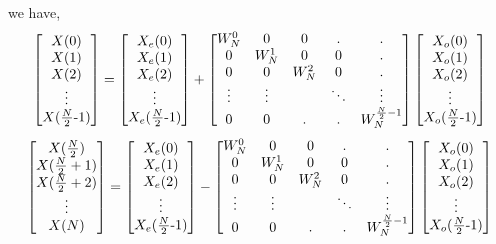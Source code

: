 \documentclass{beamer}
\begin{document}
\begin{frame}
    

we have,
\begin{equation}
\begin{bmatrix}
X(0) \\
X(1) \\
X(2) \\
\vdots \\
X(${{$\frac{N}{2}$}-1}$)
\end{bmatrix}
= 
\begin{bmatrix}
X_{e}(0) \\
X_{e}(1) \\
X_{e}(2) \\
\vdots \\
X_{e}(${{$\frac{N}{2}$}-1}$)
\end{bmatrix}
+
\begin{bmatrix}
W^{0}_{N} & 0  &0 &. &. \\
0 & W^{1}_{N} & 0 & 0 &. \\
0 & 0 & W^{2}_{N} & 0 &. \\
\vdots & \vdots& & \ddots & \vdots\\
0 & 0 &. &. &W^{\frac{N}{2}-1}_{N}
\end{bmatrix}
\begin{bmatrix}
X_{o}(0) \\
X_{o}(1) \\
X_{o}(2) \\
\vdots \\
X_{o}(${{$\frac{N}{2}$}-1}$)
\end{bmatrix}
\end{equation}
\bigskip
\begin{equation}
\begin{bmatrix}
X(\frac{N}{2}) \\
X(\frac{N}{2}+1) \\
X(\frac{N}{2}+2) \\
\vdots \\
X(N)
\end{bmatrix}
= 
\begin{bmatrix}
X_{e}(0) \\
X_{e}(1) \\
X_{e}(2) \\
\vdots \\
X_{e}(${{$\frac{N}{2}$}-1}$)
\end{bmatrix}
-
\begin{bmatrix}
W^{0}_{N} & 0  &0 &. &. \\
0 & W^{1}_{N} & 0 & 0 &. \\
0 & 0 & W^{2}_{N} & 0 &. \\
\vdots & \vdots& & \ddots & \vdots\\
0 & 0 &. &. &W^{\frac{N}{2}-1}_{N}
\end{bmatrix}
\begin{bmatrix}
X_{o}(0) \\
X_{o}(1) \\
X_{o}(2) \\
\vdots \\
X_{o}(${{$\frac{N}{2}$}-1}$)
\end{bmatrix}
\end{equation}
\end{frame}
\end{document}
